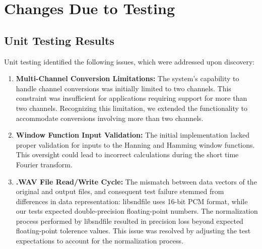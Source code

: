 \documentclass[12pt, titlepage]{article}
\begin{document}
\section{Changes Due to Testing}
\subsection{Unit Testing Results}
Unit testing identified the following issues, which were addressed upon discovery:
\begin{enumerate}
  \item \textbf{Multi-Channel Conversion Limitations:} The system's capability to handle channel conversions was 
  initially limited to two channels. This constraint was insufficient for applications requiring support 
  for more than two channels. Recognizing this limitation, we extended the functionality to accommodate 
  conversions involving more than two channels.
  \item \textbf{Window Function Input Validation:} The initial implementation lacked proper validation for inputs 
  to the Hanning and Hamming window functions. This oversight could lead to incorrect calculations during 
  the short time Fourier transform.
  \item \textbf{.WAV File Read/Write Cycle:} The mismatch between data vectors of the original and output files, and consequent 
  test failure stemmed from differences in data representation: libsndfile uses 16-bit PCM format, while our tests expected 
  double-precision floating-point numbers. The normalization process performed by libsndfile resulted in precision loss beyond
  expected floating-point tolerence values. This issue was resolved by adjusting the test expectations to account for the
  normalization process.
\end{enumerate}
\end{document}
